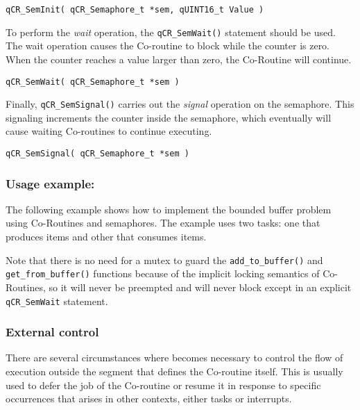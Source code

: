 \begin{lstlisting}[style=CStyle]
qCR_SemInit( qCR_Semaphore_t *sem, qUINT16_t Value )
\end{lstlisting}

To perform the \textit{wait} operation, the \lstinline{qCR_SemWait()}  statement should be used. The wait operation causes the Co-routine to block while the counter is zero. When the counter reaches a value larger than zero, the Co-Routine will continue.
\medskip


\begin{lstlisting}[style=CStyle]
qCR_SemWait( qCR_Semaphore_t *sem )
\end{lstlisting}

Finally, \lstinline{qCR_SemSignal()}  carries out the \textit{signal} operation on the semaphore. This signaling increments the counter inside the semaphore, which eventually will cause waiting Co-routines to continue executing.
\medskip

\begin{lstlisting}[style=CStyle]
qCR_SemSignal( qCR_Semaphore_t *sem )
\end{lstlisting}


\subsubsection*{Usage example:}
The following example shows how to implement the bounded buffer problem using Co-Routines and semaphores. The example uses two tasks: one that produces items and other that consumes items.

Note that there is no need for a mutex to guard the \lstinline{add_to_buffer()} and \lstinline{get_from_buffer()} functions because of the implicit locking semantics of Co-Routines, so it will never be preempted and will never block except in an explicit \lstinline{qCR_SemWait} statement.
\medskip



\subsubsection{External control}
There are several circumstances where becomes necessary to control the flow of execution outside the segment that defines the Co-routine itself. This is usually used to defer the job of the Co-routine or resume it in response to specific occurrences that arises in other contexts, either tasks or interrupts.

